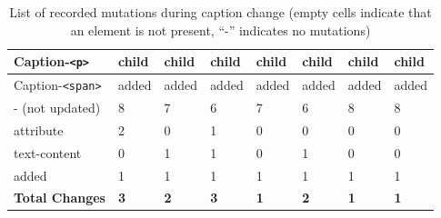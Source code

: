 \documentclass[a4paper, 12pt]{article}
\begin{document}
\begin{table}[!ht]
\begin{adjustbox}{angle=90}
\begin{tabular}{|l|l|l|l|l|l|l|l|}
      Caption-\verb|<p>|              & child             & child           & child             & child         & child           & child           & child           \\ \hline
      Caption-\verb|<span>|           & added             & added           & added             & added         & added           & added           & added           \\ \hline
      \hline
      - (not updated)                 & 8                 & 7               & 6                 & 7             & 6               & 8               & 8               \\ \hline
      \hline
      attribute                       & 2                 & 0               & 1                 & 0             & 0               & 0               & 0               \\ \hline
      text-content                    & 0                 & 1               & 1                 & 0             & 1               & 0               & 0               \\ \hline
      added                           & 1                 & 1               & 1                 & 1             & 1               & 1               & 1               \\ \hline
      \hline
      \textbf{Total Changes}          & \textbf{3}        & \textbf{2}      & \textbf{3}        & \textbf{1}    & \textbf{2}      & \textbf{1}      & \textbf{1}      \\ \hline
    \end{tabular}
  \end{adjustbox}
  \caption{List of recorded mutations during caption change (empty cells indicate that an element is not present, \enquote{-} indicates no mutations)}
  \label{tab:mutations:captionChange}
\end{table}
\end{document}
